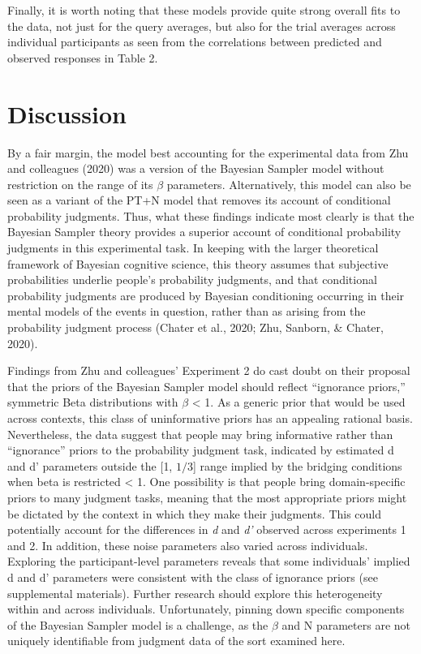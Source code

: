\documentclass[
  english,
  man,floatsintext]{apa6}
\begin{document}
Finally, it is worth noting that these models provide quite strong overall fits to the data, not just for the query averages, but also for the trial averages across individual participants as seen from the correlations between predicted and observed responses in Table 2.

\hypertarget{discussion}{%
\section{Discussion}\label{discussion}}

By a fair margin, the model best accounting for the experimental data from Zhu and colleagues (2020) was a version of the Bayesian Sampler model without restriction on the range of its \(\beta\) parameters. Alternatively, this model can also be seen as a variant of the PT+N model that removes its account of conditional probability judgments. Thus, what these findings indicate most clearly is that the Bayesian Sampler theory provides a superior account of conditional probability judgments in this experimental task. In keeping with the larger theoretical framework of Bayesian cognitive science, this theory assumes that subjective probabilities underlie people's probability judgments, and that conditional probability judgments are produced by Bayesian conditioning occurring in their mental models of the events in question, rather than as arising from the probability judgment process (Chater et al., 2020; Zhu, Sanborn, \& Chater, 2020).

Findings from Zhu and colleagues' Experiment 2 do cast doubt on their proposal that the priors of the Bayesian Sampler model should reflect ``ignorance priors,'' symmetric Beta distributions with \(\beta\) \textless{} 1. As a generic prior that would be used across contexts, this class of uninformative priors has an appealing rational basis. Nevertheless, the data suggest that people may bring informative rather than ``ignorance'' priors to the probability judgment task, indicated by estimated d and d' parameters outside the {[}1, \(1/3\){]} range implied by the bridging conditions when beta is restricted \textless{} 1. One possibility is that people bring domain-specific priors to many judgment tasks, meaning that the most appropriate priors might be dictated by the context in which they make their judgments. This could potentially account for the differences in \emph{d} and \emph{d'} observed across experiments 1 and 2. In addition, these noise parameters also varied across individuals. Exploring the participant-level parameters reveals that some individuals' implied d and d' parameters were consistent with the class of ignorance priors (see supplemental materials). Further research should explore this heterogeneity within and across individuals. Unfortunately, pinning down specific components of the Bayesian Sampler model is a challenge, as the \(\beta\) and N parameters are not uniquely identifiable from judgment data of the sort examined here.
\end{document}
